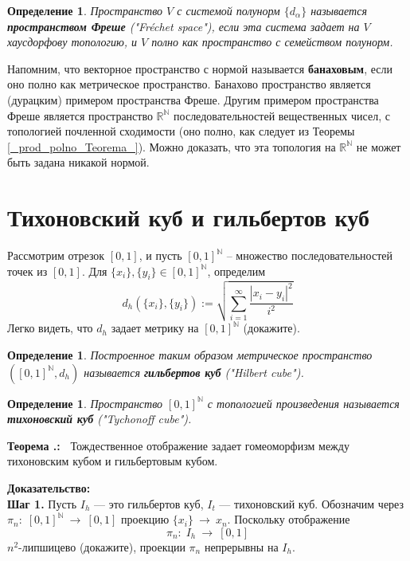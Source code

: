 \documentclass[12pt]{book}
\newcommand{\arrow}{{\:\longrightarrow\:}}
\def\R{{\mathbb R}}
\def\N{{\mathbb N}}
\theoremstyle{upshape}
\theoremstyle{generic}
\newtheorem{opredelenie}[teorema]{Определение}
\def\еза{\end{remark}}
\theoremstyle{upshapenonumber}
\newcommand{\следствие}{%
     \refstepcounter{teorema}
     {\noindent\bf Следствие \thechapter.\arabic{teorema}:\ }}
\newcommand{\пример}{%
     \refstepcounter{teorema}
     {\noindent\bf Пример \thechapter.\arabic{teorema}:\ }}
\newcommand{\лемма}{%
     \refstepcounter{teorema}
     {\noindent\bf Лемма \thechapter.\arabic{teorema}:\ }}
\newcommand{\теорема}{%
     \refstepcounter{teorema}
     {\noindent\bf Теорема \thechapter.\arabic{teorema}:\ }}
\newcommand{\утверждение}{%
     \refstepcounter{teorema}
     {\noindent\bf Утверждение \thechapter.\arabic{teorema}:\ }}
\def\хфилл{\hfill}
\def\бф{\bf}
\def\ем{\em}
\def\ез{\end{zadacha}}
\def\еу{\end{ukazanie}}
\def\определение{\begin{opredelenie}}
\def\ео{\end{opredelenie}}
\def\енум{\begin{enumerate}}
\def\ее{\end{enumerate}}
\begin{document}
\определение
Пространство $V$ с системой полунорм $\{d_\alpha\}$ называется
{\бф пространством Фреше} ("Fr\'echet space"), если эта система задает на $V$
хаусдорфову топологию, и $V$ полно как пространство с 
семейством полунорм.
\ео

Напомним, что векторное пространство с нормой
называется {\бф банаховым}, если оно полно как
метрическое пространство. Банахово пространство
является (дурацким) примером пространства Фреше.
Другим примером пространства Фреше является
пространство $\R^\N$ последовательностей вещественных
чисел, с топологией почленной сходимости
(оно полно, как следует из Теоремы
\ref{_prod_polno_Teorema_}). 
Можно доказать, что эта топология на 
$\R^\N$ не может быть задана никакой нормой.



\section{Тихоновский куб и гильбертов куб}



Рассмотрим отрезок $[0,1]$, и пусть $[0,1]^{\N}$ --
множество последовательностей точек из $[0,1]$.
Для $\{x_i\}, \{y_i\}\in [0,1]^{\N}$, определим
\[ 
  d_h(\{x_i\}, \{y_i\}):= \sqrt{\sum^\infty_{i=1} \frac{|x_i-y_i|^2}{i^2}}
\]
Легко видеть, что $d_h$ задает метрику на $[0,1]^{\N}$ 
(докажите).

\определение
Построенное таким образом метрическое
про\-с\-т\-ранство $([0,1]^{\N}, d_h)$ называется
{\бф гильбертов куб} ("Hilbert cube").
\ео

\определение
Пространство $[0,1]^{\N}$ с топологией произведения
называется {\бф тихоновский куб} ("Tychonoff cube").
\ео

\хфилл

\теорема\label{_Hilb_Tych_Theorem_}
Тождественное отображение
задает гомеоморфизм между тихоновским
кубом и гильбертовым кубом.

\хфилл

\noindent
{\бф Доказательство:}\\
\noindent
{\бф Шаг 1.} Пусть $I_h$ --- это гильбертов куб, $I_t$ --- тихоновский
куб. Обозначим через $\pi_n:\; [0,1]^{\N} \arrow [0,1]$ проекцию
$\{x_i\}\arrow x_n$. Поскольку отображение \[ \pi_n:\; I_h\arrow [0,1]\]
$n^2$-липшицево (докажите), проекции $\pi_n$  непрерывны на $I_h$.
\end{document}
